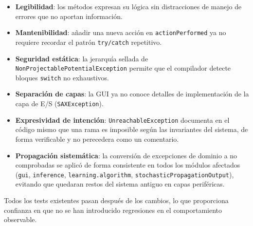 \documentclass[12pt,a4paper]{article}
\begin{document}
\begin{itemize}
  \item \textbf{Legibilidad}: los métodos expresan su lógica sin distracciones
    de manejo de errores que no aportan información.
  \item \textbf{Mantenibilidad}: añadir una nueva acción en \texttt{actionPerformed}
    ya no requiere recordar el patrón \texttt{try/catch} repetitivo.
  \item \textbf{Seguridad estática}: la jerarquía sellada de
    \texttt{NonProjectablePotentialException} permite que el compilador detecte
    bloques \texttt{switch} no exhaustivos.
  \item \textbf{Separación de capas}: la GUI ya no conoce detalles de
    implementación de la capa de E/S (\texttt{SAXException}).
  \item \textbf{Expresividad de intención}: \texttt{UnreachableException}
    documenta en el código mismo que una rama es imposible según las invariantes
    del sistema, de forma verificable y no perecedera como un comentario.
  \item \textbf{Propagación sistemática}: la conversión de excepciones de
    dominio a no comprobadas se aplicó de forma consistente en todos los módulos
    afectados (\texttt{gui}, \texttt{inference}, \texttt{learning.algorithm},
    \texttt{stochasticPropagationOutput}), evitando que quedaran restos del
    sistema antiguo en capas periféricas.
\end{itemize}

Todos los tests existentes pasan después de los cambios, lo que proporciona
confianza en que no se han introducido regresiones en el comportamiento
observable.
\end{document}

